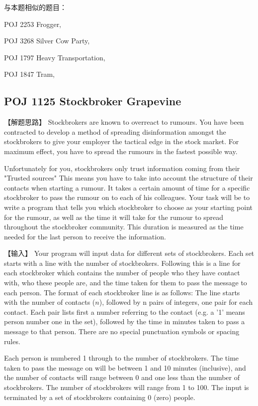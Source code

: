与本题相似的题目：
\begindot
\item POJ 2253 Frogger, 
\item POJ 3268 Silver Cow Party, 
\item POJ 1797 Heavy Transportation, 
\item POJ 1847 Tram, 
\myenddot


\subsection{POJ 1125 Stockbroker Grapevine}
【解题思路】
Stockbrokers are known to overreact to rumours. You have been contracted to develop a method of spreading disinformation amongst the stockbrokers to give your employer the tactical edge in the stock market. For maximum effect, you have to spread the rumours in the fastest possible way.

Unfortunately for you, stockbrokers only trust information coming from their "Trusted sources" This means you have to take into account the structure of their contacts when starting a rumour. It takes a certain amount of time for a specific stockbroker to pass the rumour on to each of his colleagues. Your task will be to write a program that tells you which stockbroker to choose as your starting point for the rumour, as well as the time it will take for the rumour to spread throughout the stockbroker community. This duration is measured as the time needed for the last person to receive the information.

【输入】
Your program will input data for different sets of stockbrokers. Each set starts with a line with the number of stockbrokers. Following this is a line for each stockbroker which contains the number of people who they have contact with, who these people are, and the time taken for them to pass the message to each person. The format of each stockbroker line is as follows: The line starts with the number of contacts ($n$), followed by n pairs of integers, one pair for each contact. Each pair lists first a number referring to the contact (e.g. a '1' means person number one in the set), followed by the time in minutes taken to pass a message to that person. There are no special punctuation symbols or spacing rules.

Each person is numbered 1 through to the number of stockbrokers. The time taken to pass the message on will be between 1 and 10 minutes (inclusive), and the number of contacts will range between 0 and one less than the number of stockbrokers. The number of stockbrokers will range from 1 to 100. The input is terminated by a set of stockbrokers containing 0 (zero) people.

